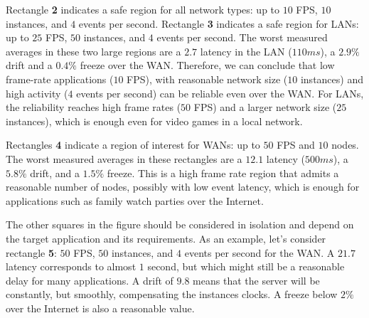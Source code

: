 \documentclass[sigplan,screen]{acmart}
\begin{document}
Rectangle \textbf{2} indicates a safe region for all network types: up to $10$
FPS, $10$ instances, and $4$ events per second.
%
Rectangle \textbf{3} indicates a safe region for LANs: up to $25$ FPS, $50$
instances, and $4$ events per second.
%
The worst measured averages in these two large regions are
    a $2.7$ latency in the LAN ($110ms$),
    a $2.9\%$ drift and
    a $0.4\%$ freeze over the WAN.
%
Therefore, we can conclude that low frame-rate applications ($10$ FPS), with
reasonable network size ($10$ instances) and high activity ($4$ events per
second) can be reliable even over the WAN.
For LANs, the reliability reaches high frame rates ($50$ FPS) and a larger
network size ($25$ instances), which is enough even for video games in a local
network.

Rectangles \textbf{4} indicate a region of interest for WANs: up to $50$ FPS
and $10$ nodes.
The worst measured averages in these rectangles are
    a $12.1$ latency ($500ms$),
    a $5.8\%$ drift, and
    a $1.5\%$ freeze.
This is a high frame rate region that admits a reasonable number of nodes,
possibly with low event latency, which is enough for applications such as
family watch parties over the Internet.

The other squares in the figure should be considered in isolation and depend on
the target application and its requirements.
%
As an example, let's consider rectangle \textbf{5}: $50$ FPS, $50$ instances,
and $4$ events per second for the WAN.
A $21.7$ latency corresponds to almost $1$ second, but which might still be a
reasonable delay for many applications.
A drift of $9.8$ means that the server will be constantly, but smoothly,
compensating the instances clocks.
A freeze below $2\%$ over the Internet is also a reasonable value.

\end{document}
